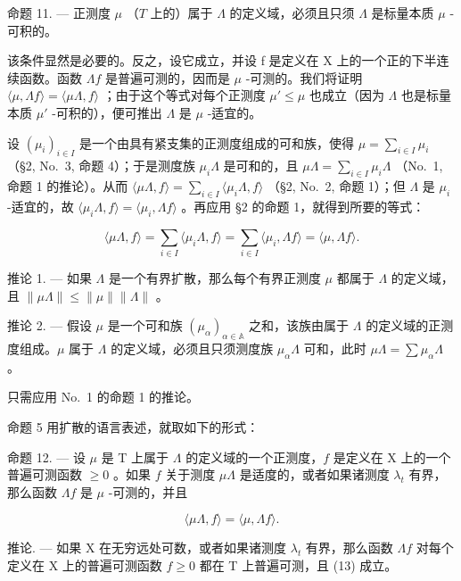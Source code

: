 命题 11. --- 正测度 \(\mu\) （\(T\) 上的）属于 \(\Lambda\) 的定义域，必须且只须 \(\Lambda\) 是标量本质 \(\mu\) -可积的。

该条件显然是必要的。反之，设它成立，并设 f 是定义在 X 上的一个正的下半连续函数。函数 \(\Lambda f\) 是普遍可测的，因而是 \(\mu\) -可测的。我们将证明 \(\langle\mu,\Lambda f\rangle=\langle\mu\Lambda,f\rangle\) ；由于这个等式对每个正测度 \(\mu'\leqslant\mu\) 也成立（因为 \(\Lambda\) 也是标量本质 \(\mu'\) -可积的），便可推出 \(\Lambda\) 是 \(\mu\) -适宜的。

设 \((\mu_i)_{i\in I}\) 是一个由具有紧支集的正测度组成的可和族，使得 \(\mu = \sum_{i\in I}\mu_i\) （§2, No.~3, 命题 4）；于是测度族 \(\mu_{i}\Lambda\) 是可和的，且 \(\mu \Lambda = \sum_{i\in I}\mu_{i}\Lambda\) （No.~1, 命题 1 的推论）。从而 \(\langle \mu \Lambda ,f\rangle = \sum_{i\in I}\langle \mu_i\Lambda ,f\rangle\) （§2, No.~2, 命题 1）；但 \(\Lambda\) 是 \(\mu_{i}\) -适宜的，故 \(\langle \mu_i\Lambda ,f\rangle = \langle \mu_i,\Lambda f\rangle\) 。再应用 §2 的命题 1，就得到所要的等式：

\[
\langle \mu \Lambda , f \rangle = \sum_ {i \in I} \langle \mu_ {i} \Lambda , f \rangle = \sum_ {i \in I} \langle \mu_ {i}, \Lambda f \rangle = \langle \mu , \Lambda f \rangle .
\]

推论 1. --- 如果 \(\Lambda\) 是一个有界扩散，那么每个有界正测度 \(\mu\) 都属于 \(\Lambda\) 的定义域，且 \(\|\mu\Lambda\| \leqslant \|\mu\|\|\Lambda\|\) 。

推论 2. --- 假设 \(\mu\) 是一个可和族 \((\mu_{\alpha})_{\alpha \in \mathbb{A}}\) 之和，该族由属于 \(\Lambda\) 的定义域的正测度组成。\(\mu\) 属于 \(\Lambda\) 的定义域，必须且只须测度族 \(\mu_{\alpha}\Lambda\) 可和，此时 \(\mu \Lambda = \sum \mu_{\alpha}\Lambda\) 。

只需应用 No.~1 的命题 1 的推论。

命题 5 用扩散的语言表述，就取如下的形式：

命题 12. --- 设 \(\mu\) 是 T 上属于 \(\Lambda\) 的定义域的一个正测度，\(f\) 是定义在 X 上的一个普遍可测函数 \(\geqslant 0\) 。如果 \(f\) 关于测度 \(\mu\Lambda\) 是适度的，或者如果诸测度 \(\lambda_t\) 有界，那么函数 \(\Lambda f\) 是 \(\mu\) -可测的，并且

\[
\langle \mu \Lambda , f \rangle = \langle \mu , \Lambda f \rangle .\tag{13}
\]

推论. --- 如果 X 在无穷远处可数，或者如果诸测度 \(\lambda_{t}\) 有界，那么函数 \(\Lambda f\) 对每个定义在 X 上的普遍可测函数 \(f \geqslant 0\) 都在 T 上普遍可测，且 (13) 成立。


